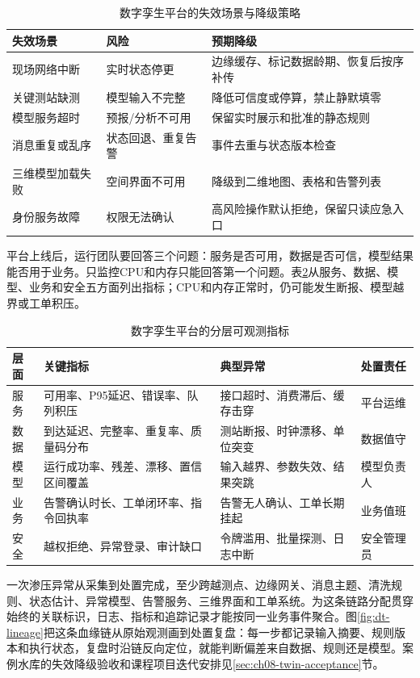 \begin{table}[htbp]
\centering
\caption{数字孪生平台的失效场景与降级策略}
\label{tab:dt-degradation}
\begin{tabular}{p{3.2cm}p{4.5cm}p{4.8cm}}
\toprule
失效场景 & 风险 & 预期降级 \\
\midrule
现场网络中断 & 实时状态停更 & 边缘缓存、标记数据龄期、恢复后按序补传 \\
关键测站缺测 & 模型输入不完整 & 降低可信度或停算，禁止静默填零 \\
模型服务超时 & 预报/分析不可用 & 保留实时展示和批准的静态规则 \\
消息重复或乱序 & 状态回退、重复告警 & 事件去重与状态版本检查 \\
三维模型加载失败 & 空间界面不可用 & 降级到二维地图、表格和告警列表 \\
身份服务故障 & 权限无法确认 & 高风险操作默认拒绝，保留只读应急入口 \\
\bottomrule
\end{tabular}
\end{table}

平台上线后，运行团队要回答三个问题：服务是否可用，数据是否可信，模型结果能否用于业务。只监控CPU和内存只能回答第一个问题。表\ref{tab:dt-observability}从服务、数据、模型、业务和安全五方面列出指标；CPU和内存正常时，仍可能发生断报、模型越界或工单积压。

\begin{table}[htbp]
\centering
\caption{数字孪生平台的分层可观测指标}
\label{tab:dt-observability}
\begin{tabular}{p{2.1cm}p{4.2cm}p{4.2cm}p{2.5cm}}
\toprule
层面 & 关键指标 & 典型异常 & 处置责任 \\
\midrule
服务 & 可用率、P95延迟、错误率、队列积压 & 接口超时、消费滞后、缓存击穿 & 平台运维 \\
数据 & 到达延迟、完整率、重复率、质量码分布 & 测站断报、时钟漂移、单位突变 & 数据值守 \\
模型 & 运行成功率、残差、漂移、置信区间覆盖 & 输入越界、参数失效、结果突跳 & 模型负责人 \\
业务 & 告警确认时长、工单闭环率、指令回执率 & 告警无人确认、工单长期挂起 & 业务值班 \\
安全 & 越权拒绝、异常登录、审计缺口 & 令牌滥用、批量探测、日志中断 & 安全管理员 \\
\bottomrule
\end{tabular}
\end{table}

一次渗压异常从采集到处置完成，至少跨越测点、边缘网关、消息主题、清洗规则、状态估计、异常模型、告警服务、三维界面和工单系统。为这条链路分配贯穿始终的关联标识，日志、指标和追踪记录才能按同一业务事件聚合。图\ref{fig:dt-lineage}把这条血缘链从原始观测画到处置复盘：每一步都记录输入摘要、规则版本和执行状态，复盘时沿链反向定位，就能判断偏差来自数据、规则还是模型。案例水库的失效降级验收和课程项目迭代安排见\ref{sec:ch08-twin-acceptance}节。

